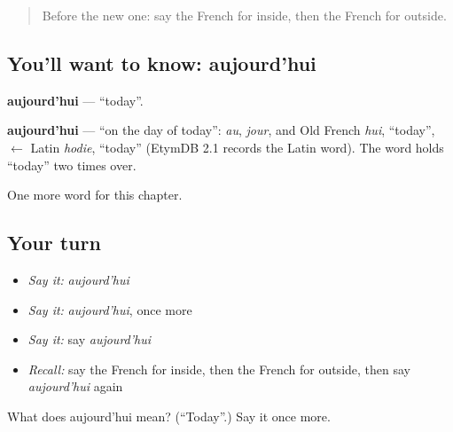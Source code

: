 \begin{quote}
Before the new one: say the French for inside, then the French for outside.
\end{quote}

\subsection*{You'll want to know: aujourd'hui}
\textbf{aujourd'hui} — \textquotedblleft{}today\textquotedblright{}.

\begin{cousinweb}
\textbf{aujourd'hui} — \textquotedblleft{}on the day of today\textquotedblright{}: \emph{au}, \emph{jour}, and Old French \emph{hui}, \textquotedblleft{}today\textquotedblright{}, $\leftarrow$ Latin \emph{hodie}, \textquotedblleft{}today\textquotedblright{} (EtymDB 2.1 records the Latin word). The word holds \textquotedblleft{}today\textquotedblright{} two times over.
\end{cousinweb}

\begin{grammarlens}[title={What you've built}]
One more word for this chapter.
\end{grammarlens}

\subsection*{Your turn}
\begin{itemize}
\raggedright
  \item \emph{Say it:} \emph{aujourd'hui}
  \item \emph{Say it:} \emph{aujourd'hui}, once more
  \item \emph{Say it:} say \emph{aujourd'hui}
  \item \emph{Recall:} say the French for inside, then the French for outside, then say \emph{aujourd'hui} again
\end{itemize}

\begin{tcolorbox}[breakable,colback=teal!4,colframe=teal!35!black,title={Before you move on}]
What does aujourd'hui mean? (\textquotedblleft{}Today\textquotedblright{}.) Say it once more.
\end{tcolorbox}
